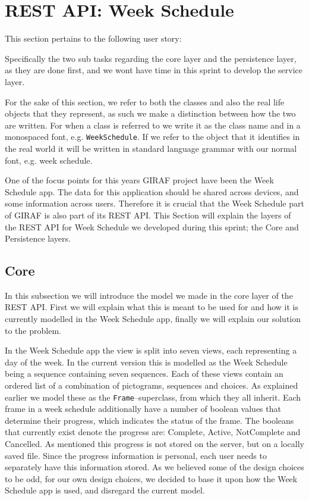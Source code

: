\section{REST API: Week Schedule}\label{sec:restws}
This section pertains to the following user story:
\begin{center}
\end{center}
Specifically the two sub tasks regarding the core layer and the persistence layer, as they are done first, and we wont have time in this sprint to develop the service layer.

For the sake of this section, we refer to both the classes and also the real life objects that they represent, as such we make a distinction between how the two are written.
For when a class is referred to we write it as the class name and in a monospaced font, e.g. \texttt{WeekSchedule}.
If we refer to the object that it identifies in the real world it will be written in standard language grammar with our normal font, e.g. week schedule.

\noindent
One of the focus points for this years GIRAF project have been the Week Schedule app.
The data for this application should be shared across devices, and some information across users.
Therefore it is crucial that the Week Schedule part of GIRAF is also part of its REST API.
This Section will explain the layers of the REST API for Week Schedule we developed during this sprint; the Core and Persistence layers. 

\subsection{Core}
In this subsection we will introduce the model we made in the core layer of the REST API.
First we will explain what this is meant to be used for and how it is currently modelled in the Week Schedule app, finally we will explain our solution to the problem. 

In the Week Schedule app the view is split into seven views, each representing a day of the week.
In the current version this is modelled as the Week Schedule being a sequence containing seven sequences.
Each of these views contain an ordered list of a combination of pictograms, sequences and choices.
As explained earlier we model these as the \texttt{Frame}--superclass, from which they all inherit. %
Each frame in a week schedule additionally have a number of boolean values that determine their progress, which indicates the status of the frame. 
The booleans that currently exist denote the progress are: Complete, Active, NotComplete and Cancelled. 
As mentioned this progress is not stored on the server, but on a locally saved file.
Since the progress information is personal, each user needs to separately have this information stored. 
As we believed some of the design choices to be odd, for our own design choices, we decided to base it upon how the Week Schedule app is used, and disregard the current model.

